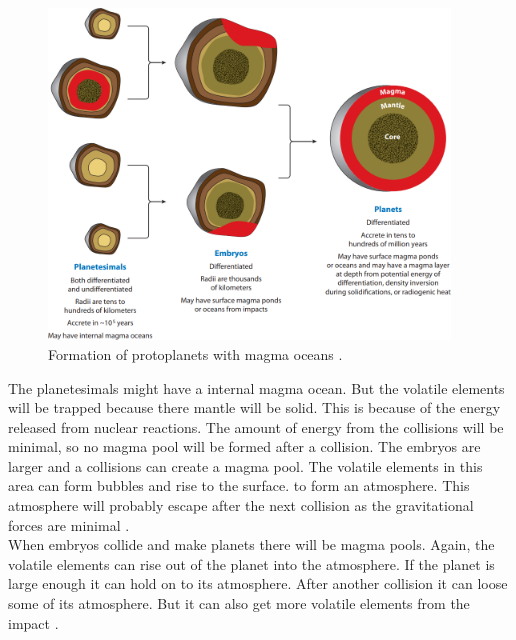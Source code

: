 \begin{figure}[H]
	\center
	\includegraphics[width=0.95\textwidth]{figures/protoplanets.png}
	\caption{\label{fig:protoplanets}Formation of protoplanets with magma oceans \cite[p.~120]{TPmagma}.}
\end{figure}

The planetesimals might have a internal magma ocean. But the volatile elements will be trapped because there mantle will be solid. This is because of the energy released from nuclear reactions. The amount of energy from the collisions will be minimal, so no magma pool will be formed after a collision. The embryos are larger and a collisions can create a magma pool. The volatile elements in this area can form bubbles and rise to the surface. to form an atmosphere. This atmosphere will probably escape after the next collision as the gravitational forces are minimal \cite[p.~118-123]{TPmagma}.\\

When embryos collide and make planets there will be magma pools. Again, the volatile elements can rise out of the planet into the atmosphere. If the planet is large enough it can hold on to its atmosphere. After another collision it can loose some of its atmosphere. But it can also get more volatile elements from the impact \cite[p.~118-123]{TPmagma}. 







\newpage
